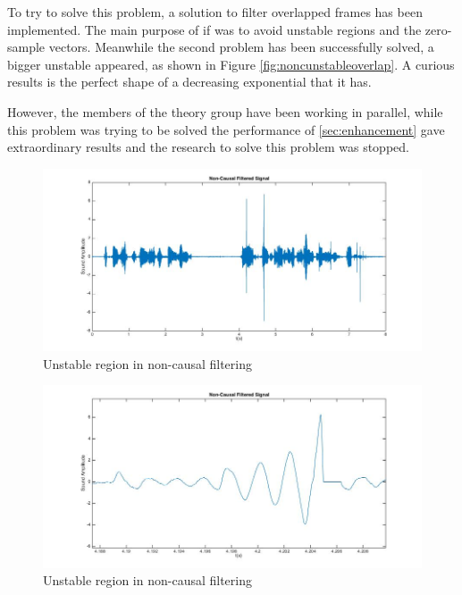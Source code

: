 \documentclass[11pt,a4paper,spanish]{book}  %
\theoremstyle{definition}  %
\theoremstyle{plain}  %
\theoremstyle{remark}  %
\begin{document}
		To try to solve this problem, a solution to filter overlapped frames has been implemented. The main purpose of if was to avoid unstable regions and the zero-sample vectors. Meanwhile the second problem has been successfully solved, a bigger unstable appeared, as shown in Figure \ref{fig:noncunstableoverlap}. A curious results is the perfect shape of a decreasing exponential that it has.
		
		However, the members of the theory group have been working in parallel, while this problem was trying to be solved the performance of \ref{sec:enhancement} gave extraordinary results and the research to solve this problem was stopped.
		
	
		
		\begin{figure}[h]
		\centering
		\includegraphics[width=15cm]{images/theory/nonc.jpg}
		\caption{Unstable region in non-causal filtering}
		\label{fig:nonc}
		\end{figure}		
		
		\begin{figure}[h]
		\centering
		\includegraphics[width=15cm]{images/theory/noncunstable.jpg}
		\caption{Unstable region in non-causal filtering}
		\label{fig:noncunstable}
		\end{figure}
		
\end{document}
